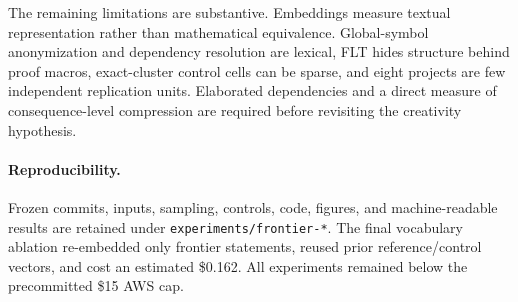 \documentclass[10pt]{article}
\begin{document}
The remaining limitations are substantive.  Embeddings measure textual
representation rather than mathematical equivalence.  Global-symbol
anonymization and dependency resolution are lexical, FLT hides structure behind
proof macros, exact-cluster control cells can be sparse, and eight projects are
few independent replication units.  Elaborated dependencies and a direct
measure of consequence-level compression are required before revisiting the
creativity hypothesis.

\paragraph{Reproducibility.}
Frozen commits, inputs, sampling, controls, code, figures, and machine-readable
results are retained under \texttt{experiments/frontier-*}.  The final
vocabulary ablation re-embedded only frontier statements, reused prior
reference/control vectors, and cost an estimated \$0.162.  All experiments
remained below the precommitted \$15 AWS cap.
\end{document}
